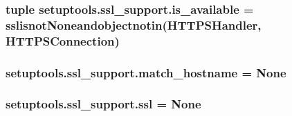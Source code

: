 \subsubsection[{is\+\_\+available}]{\setlength{\rightskip}{0pt plus 5cm}tuple setuptools.\+ssl\+\_\+support.\+is\+\_\+available = sslisnot\+Noneandobjectnotin({\bf H\+T\+T\+P\+S\+Handler}, H\+T\+T\+P\+S\+Connection)}\label{namespacesetuptools_1_1ssl__support_a7f0e0bdf1c4ae2136919ca7662df6094}
\hypertarget{namespacesetuptools_1_1ssl__support_a8a8e98ff0935d8cda04e2f19fd235bc2}{}
\subsubsection[{match\+\_\+hostname}]{\setlength{\rightskip}{0pt plus 5cm}setuptools.\+ssl\+\_\+support.\+match\+\_\+hostname = None}\label{namespacesetuptools_1_1ssl__support_a8a8e98ff0935d8cda04e2f19fd235bc2}
\hypertarget{namespacesetuptools_1_1ssl__support_a55a27a1705e0f1696f44078a212ed844}{}
\subsubsection[{ssl}]{\setlength{\rightskip}{0pt plus 5cm}setuptools.\+ssl\+\_\+support.\+ssl = None}\label{namespacesetuptools_1_1ssl__support_a55a27a1705e0f1696f44078a212ed844}
